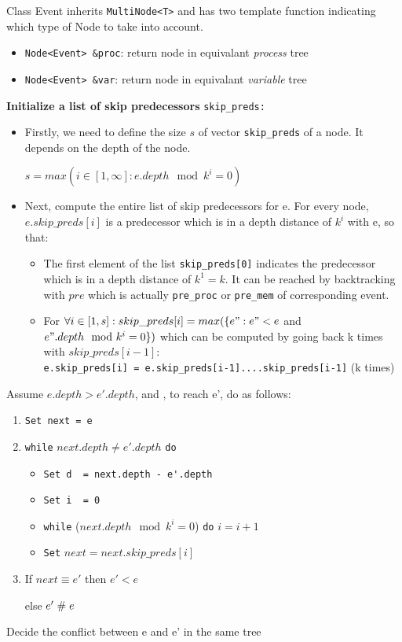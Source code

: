 \documentclass{llncs}
\begin{document}
Class Event inherits \verb!MultiNode<T>! and has two template function indicating which type of Node to take into account.
\begin{itemize}
	\item	
	\verb!Node<Event> &proc!: return node in equivalant \textit{process} tree
	\item	
	\verb!Node<Event> &var!: return node in equivalant \textit{variable} tree 	
\end{itemize}

\noindent
\textbf{Initialize a list of skip predecessors} \verb!skip_preds:!
\begin{itemize}
	\item
	Firstly, we need to define the size $s$ of vector \verb!skip_preds! of a node. It depends on the depth of the node.
	
	$s = max(i \in [1,\infty]: e.depth \mod k^{i} = 0 )$ 
	\item
	Next, compute the entire list of skip predecessors for e. For every node, $e.skip\_preds[i]$ is a predecessor which is in a depth 			distance of $k^{i}$ with e, so that:
	\begin{itemize}
		\item
		The first element of the list \verb!skip_preds[0]! indicates the predecessor which is in a depth distance of $k^1 = k$. It can 				be reached by backtracking with $pre$ which is actually \verb!pre_proc! or \verb!pre_mem! of corresponding event.
		\item
		For $\forall i \in [1,s]: skip\_preds[i] = max(\{e": e" < e$ and $e".depth \mod k^i = 0\})$ which can be computed by going back 			k times with $skip\_preds[i-1]$: \\
		\verb!e.skip_preds[i] = e.skip_preds[i-1]....skip_preds[i-1]! (k times) 
	\end{itemize}
\end{itemize}

\begin{algorithm}
	\noindent
	Assume $e.depth > e'.depth$, and , to reach e', do as follows:
	\begin{enumerate}
		\item
		\verb!Set next = e!
		\item
		\verb!while! $next.depth \neq e'.depth$ \verb!do!
		\begin{itemize}
			\item
			\verb!Set d  = next.depth - e'.depth!
			\item
			\verb!Set i  = 0!
			\item
			\verb!while! ($ next.depth \mod k^{i} = 0$)   \space \verb!do!
			$i = i + 1$
			\item
			\verb!Set! $next = next.skip\_preds[i]$ 
		\end{itemize} 
		\item 
		If $next \equiv e'$ then 
		$e'< e$ 
		
		else $e'\mathrel{\#} e$	 
	\end{enumerate}
	\caption{Decide the conflict between e and e' in the same tree}
	\label{a:layer_tree}	
\end{algorithm}
\end{document}
